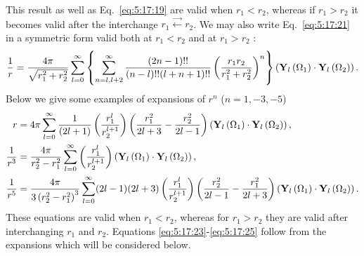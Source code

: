 This result as well as Eq.~\eqref{eq:5:17:19} are valid when $r_{1}<r_{2}$, whereas if $r_{1}>r_{2}$ it becomes valid after the interchange $r_{1} \vec{\leftarrow} r_{2}$. We may also write Eq.~\eqref{eq:5:17:21} in a symmetric form valid both at $r_{1}<r_{2}$ and at $r_{1}>r_{2}$ :
\begin{equation}
\frac{1}{r}=\frac{4 \pi}{\sqrt{r_{1}^{2}+r_{2}^{2}}} \sum_{l=0}^{\infty}\left\{\sum_{n=l, l+2}^{\infty} \frac{(2 n-1)!!}{(n-l)!!(l+n+1)!!}\left(\frac{r_{1} r_{2}}{r_{1}^{2}+r_{2}^{2}}\right)^{n}\right\}\left(\mathbf{Y}_{l}\left(\Omega_{1}\right) \cdot \mathbf{Y}_{l}\left(\Omega_{2}\right)\right). \label{eq:5:17:22}
\end{equation}
Below we give some examples of expansions of $r^{n}$ ($n=1,-3,-5$)
\begin{align}
r & =4 \pi \sum_{l=0}^{\infty} \frac{1}{(2 l+1)}\left(\frac{r_{1}^{l}}{r_{2}^{l+1}}\right)\left(\frac{r_{1}^{2}}{2 l+3}-\frac{r_{2}^{2}}{2 l-1}\right)\left(\mathbf{Y}_{l}\left(\Omega_{1}\right) \cdot \mathbf{Y}_{l}\left(\Omega_{2}\right)\right),  \label{eq:5:17:23}\\
\frac{1}{r^{3}} & =\frac{4 \pi}{r_{2}^{2}-r_{1}^{2}} \sum_{l=0}^{\infty}\left(\frac{r_{1}^{l}}{r_{2}^{l+1}}\right)\left(\mathbf{Y}_{l}\left(\Omega_{1}\right) \cdot \mathbf{Y}_{l}\left(\Omega_{2}\right)\right),  \label{eq:5:17:24}\\
\frac{1}{r^{5}} & =\frac{4 \pi}{3\left(r_{2}^{2}-r_{1}^{2}\right)^{3}} \sum_{l=0}^{\infty}(2 l-1)(2 l+3)\left(\frac{r_{1}^{l}}{r_{2}^{l+1}}\right)\left(\frac{r_{2}^{2}}{2 l-1}-\frac{r_{1}^{2}}{2 l+3}\right)\left(\mathbf{Y}_{l}\left(\Omega_{1}\right) \cdot \mathbf{Y}_{l}\left(\Omega_{2}\right)\right). \label{eq:5:17:25}
\end{align}
These equations are valid when $r_{1}<r_{2}$, whereas for $r_{1}>r_{2}$ they are valid after interchanging $r_{1}$ and $r_{2}$. Equations \eqref{eq:5:17:23}-\eqref{eq:5:17:25} follow from the expansions which will be considered below.

